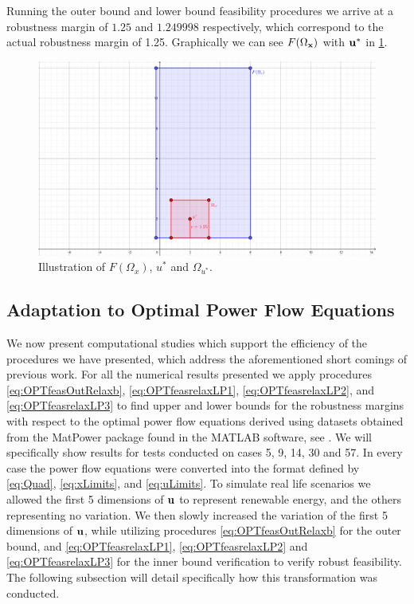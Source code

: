 Running the outer bound and lower bound feasibility procedures we arrive at a robustness margin of $1.25$ and $1.249998$ respectively, which correspond to the actual robustness margin of 1.25. 
Graphically we can see $F(\Omega_{\mathbf{x}})$ with $\mathbf{u}^*$ in \cref{fig:FOmega}.

\begin{figure}[htp!]
	\begin{center}
		\includegraphics[scale=0.45]{Figures/FOmega2} %
	\end{center}
	\caption{Illustration of $F(\Omega_x)$, $u^*$ and $\Omega_{u^*}$.}
	\label{fig:FOmega}
\end{figure}



\subsection{Adaptation to Optimal Power Flow Equations}
We now present computational studies which support the efficiency of the procedures we have presented, which address the aforementioned short comings of previous work. 
For all the numerical results presented we apply procedures \eqref{eq:OPTfeasOutRelaxb}, \eqref{eq:OPTfeasrelaxLP1}, \eqref{eq:OPTfeasrelaxLP2}, and \eqref{eq:OPTfeasrelaxLP3} to find upper and lower bounds for the robustness margins with respect to the optimal power flow equations derived using datasets obtained from the MatPower package found in the MATLAB software, see \cite{matpower}. 
We will specifically show results for tests conducted on cases 5, 9, 14, 30 and 57. 
In every case the power flow equations were converted into the format defined by \eqref{eq:Quad}, \eqref{eq:xLimits}, and \eqref{eq:uLimits}. 
To simulate real life scenarios we allowed the first 5 dimensions of $\mathbf{u}$ to represent renewable energy, and the others representing no variation. We then slowly increased the variation of the first 5 dimensions of $\mathbf{u}$, while utilizing procedures \eqref{eq:OPTfeasOutRelaxb} for the outer bound, and \eqref{eq:OPTfeasrelaxLP1}, \eqref{eq:OPTfeasrelaxLP2} and \eqref{eq:OPTfeasrelaxLP3} for the inner bound verification to verify robust feasibility. 
The following subsection will detail specifically how this transformation was conducted.

